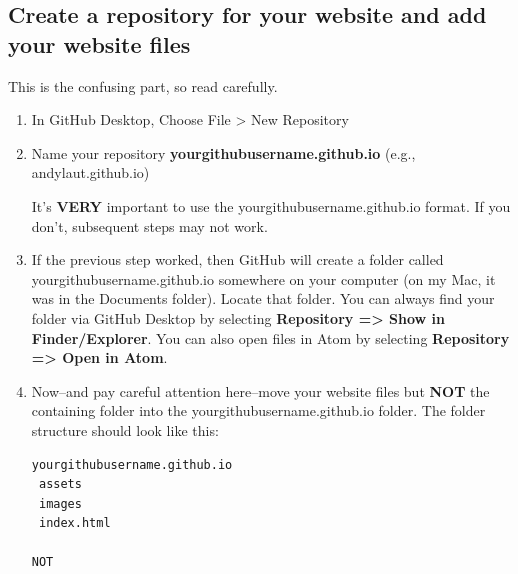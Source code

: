 \documentclass[]{book}
\theoremstyle{definition}
\theoremstyle{definition}
\theoremstyle{definition}
\theoremstyle{remark}
\begin{document}
\hypertarget{create-a-repository-for-your-website-and-add-your-website-files}{%
\subsection{Create a repository for your website and add your website
files}\label{create-a-repository-for-your-website-and-add-your-website-files}}

This is the confusing part, so read carefully.

\begin{enumerate}
\def\labelenumi{\arabic{enumi}.}
\item
  In GitHub Desktop, Choose File \textgreater{} New Repository
\item
  Name your repository \textbf{yourgithubusername.github.io} (e.g.,
  andylaut.github.io)

  It's \textbf{VERY} important to use the yourgithubusername.github.io
  format. If you don't, subsequent steps may not work.
\item
  If the previous step worked, then GitHub will create a folder called
  yourgithubusername.github.io somewhere on your computer (on my Mac, it
  was in the Documents folder). Locate that folder. You can always find
  your folder via GitHub Desktop by selecting \textbf{Repository
  =\textgreater{} Show in Finder/Explorer}. You can also open files in
  Atom by selecting \textbf{Repository =\textgreater{} Open in Atom}.
\item
  Now--and pay careful attention here--move your website files but
  \textbf{NOT} the containing folder into the
  yourgithubusername.github.io folder. The folder structure should look
  like this:

\begin{verbatim}
yourgithubusername.github.io  
 assets  
 images  
 index.html

NOT


\end{verbatim}
\end{enumerate}
\end{document}
